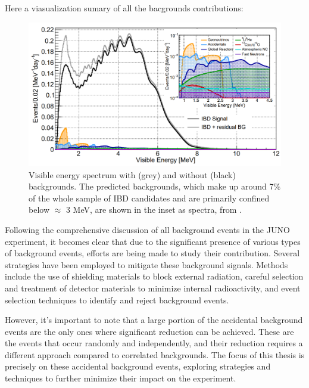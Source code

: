 Here a viasualization sumary of all the bacgrounds contributions:

\begin{figure}[h]
	\centering
	\includegraphics[width=0.7\linewidth]{Images/backgrounds_spectrum}
	\caption{Visible energy spectrum with (grey) and without (black) backgrounds. The predicted backgrounds, which make up around 7$\%$ of the whole sample of IBD candidates and are primarily confined below $\approx$ 3 MeV, are shown in the inset as spectra, from \cite{Sub_osci}.}
	\label{fig:backgroundsspectrum}
\end{figure}


Following the comprehensive discussion of all background events in the JUNO experiment, it becomes clear that due to the significant presence of various types of background events, efforts are being made to study their contribution. Several strategies have been employed to mitigate these background signals. Methods include the use of shielding materials to block external radiation, careful selection and treatment of detector materials to minimize internal radioactivity, and event selection techniques to identify and reject background events.

However, it's important to note that a large portion of the accidental background events are the only ones where significant reduction can be achieved. These are the events that occur randomly and independently, and their reduction requires a different approach compared to correlated backgrounds. The focus of this thesis is precisely on these accidental background events, exploring strategies and techniques to further minimize their impact on the experiment.\\	 
